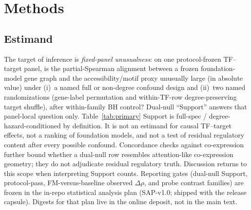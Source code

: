 \documentclass[fleqn,10pt,lineno]{wlpeerj}
\begin{document}
\begin{table}[!tbp]\centering

\caption{Protocol axes versus related evaluation resources. Entries are qualitative design
features, not performance ranks. scReg-Eval is a fixed-panel audit capsule; GeneRNIB and BioLLM-style
suites score broader tasks against often expression-linked references.}\label{tab:related}
\end{table}

\section{Methods}
\subsection{Estimand}\label{sec:estimand}
The target of inference is \emph{fixed-panel unusualness}: on one protocol-frozen TF--target panel,
is the partial-Spearman alignment between a frozen foundation-model gene graph and the
accessibility/motif proxy unusually large (in absolute value) under (i)~a named full or non-degree
confound design and (ii)~two named randomizations (gene-label permutation and within-TF-row
degree-preserving target shuffle), after within-family BH control? Dual-null ``Support'' answers
that panel-local question only. Table~\ref{tab:primary} Support is full-spec /
degree-hazard-conditioned by definition. It is not an estimand for causal TF--target effects, not a ranking
of foundation models, and not a test of residual regulatory content after every possible
confound. Concordance checks against co-expression further bound whether a dual-null row resembles
attention-like co-expression geometry; they do not adjudicate residual regulatory truth. Discussion
returns to this scope when interpreting Support counts. Reporting gates (dual-null Support,
protocol-pass, FM-versus-baseline observed $\Delta\rho$, and probe contrast families) are frozen in
the in-repo statistical analysis plan (SAP-v1.0; shipped with the release capsule).
Digests for that plan live in the online deposit, not in the main text.
\end{document}
